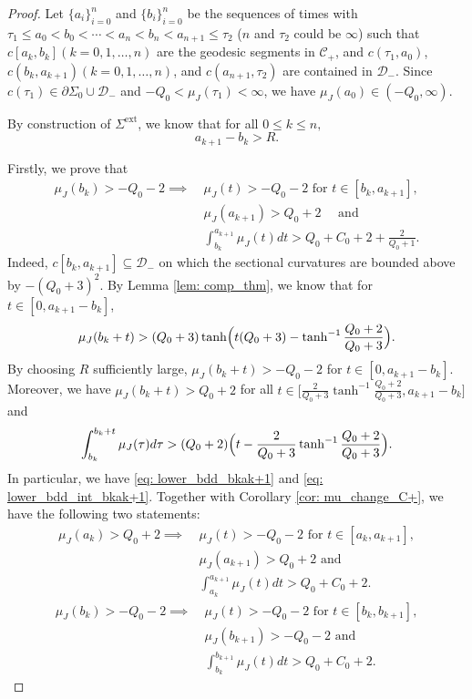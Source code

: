 \documentclass[10pt]{amsart}
\newcommand{\ext}{\mathrm{ext}}
\theoremstyle{definition}
\renewcommand{\>}{{\rangle}}
\newcommand{\<}{{\langle}}
\begin{document}
\begin{proof}

Let $\{a_i\}^n_{i=0}$ and $\{b_i\}^n_{i=0}$ be the sequences of times with $\tau_1\leq a_0<b_0<\cdots <a_n<b_n<a_{n+1}\leq \tau_2$ ($n$ and $\tau_2$ could be $\infty$) such that
$c[a_k, b_k] (k=0,1,\dots,n)$ are the geodesic segments in $\mathcal{C}_+$, and $c(\tau_1,a_0)$, $c(b_k,a_{k+1}) (k=0,1,\dots,n)$, and $c(a_{n+1},\tau_2)$ are contained in $\mathcal D_{-}$. Since $c(\tau_1)\in \partial\Sigma_0\cup \mathcal{D}_-$ and $-Q_0<\mu_J(\tau_1)<\infty$, we have $\mu_J(a_0)\in (-Q_0, \infty)$.

By construction of $\Sigma^{\ext}$, we know that for all $0\leq k\leq n,$
\[
a_{k+1}-b_k>R.
\]

Firstly, we prove that
\begin{align}
\mu_J(b_k)>-Q_0-2\implies\ & \mu_J(t)>-Q_0-2 \text{ for }t\in[b_k,a_{k+1}], \nonumber\\
& \mu_J(a_{k+1})>Q_0+2\quad \text{ and } \label{eq: lower_bdd_bkak+1}\\
& \int_{b_k}^{a_{k+1}}\mu_J(t)dt>Q_0+C_0+2+\frac{2}{Q_0+1}.\label{eq: lower_bdd_int_bkak+1}
\end{align}
Indeed, $c[b_k, a_{k+1}]\subseteq \mathcal{D}_-$ on which the sectional curvatures are bounded above by $-(Q_0+3)^2$. By Lemma \ref{lem: comp_thm}, we know that for $t\in[0, a_{k+1}-b_k]$,
\[
\mu_J(b_k+t)>(Q_0+3)\tanh\Bigl(t(Q_0+3)-\tanh^{-1}\frac{Q_0+2}{Q_0+3}\Bigr).
\]
By choosing $R$ sufficiently large, $\mu_J(b_k+t)>-Q_0-2$ for $t\in[0,a_{k+1}-b_k]$. Moreover, we have $\mu_J(b_k+t)>Q_0+2$ for all $t\in \bigl[\frac{2}{Q_0+3}\tanh^{-1}\frac{Q_0+2}{Q_0+3}, a_{k+1}-b_k\bigr]$ and
\begin{equation}\label{eq: lower_bdd_int_bkbk+t}
\int_{b_k}^{b_k+t}\mu_J(\tau)d\tau>(Q_0+2)\Bigl(t-\frac{2}{Q_0+3}\tanh^{-1}\frac{Q_0+2}{Q_0+3}\Bigr).
\end{equation}
In particular, we have \eqref{eq: lower_bdd_bkak+1} and \eqref{eq: lower_bdd_int_bkak+1}. Together with Corollary \ref{cor: mu_change_C+}, we have the following two statements:
\begin{align}\label{eq: lower_bdd_akak+1}
\mu_J(a_k)>Q_0+2\implies\ &\mu_J(t)>-Q_0-2 \text{ for }t\in[a_k,a_{k+1}], \\
& \mu_J(a_{k+1})>Q_0+2 \text{ and }\nonumber\\
& \int_{a_k}^{a_{k+1}}\mu_J(t)dt>Q_0+C_0+2.
\end{align}
\begin{align}\label{eq_lower_bdd_bkbk+1}
\mu_J(b_k)>-Q_0-2 \implies\ & \mu_J(t)>-Q_0-2 \text{ for }t\in[b_k,b_{k+1}], \\
& \mu_J(b_{k+1})>-Q_0-2 \text{ and }\nonumber\\
& \int_{b_k}^{b_{k+1}}\mu_J(t)dt>Q_0+C_0+2.
\end{align}


\end{proof}
\end{document}
